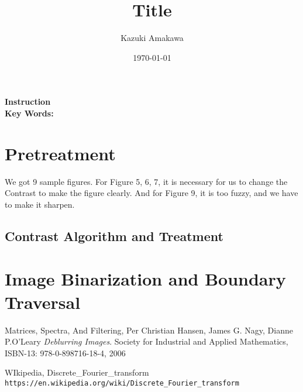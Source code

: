 \documentclass[12pt]{article}
\title{Title}
\author{Kazuki Amakawa}
\date{\today}
\begin{document}
\maketitle
\noindent \textbf{Instruction}\\

\noindent \textbf{Key Words:} \\
\newpage

\section{Pretreatment}
We got 9 sample figures. For Figure 5, 6, 7, it is necessary for us to change the Contrast to make the figure clearly. And for Figure 9, it is too fuzzy, and we have to make it sharpen.
\subsection{Contrast Algorithm and Treatment}

\section{Image Binarization and Boundary Traversal}


\newpage
\medskip
 
\begin{thebibliography}{9}
Matrices, Spectra, And Filtering, Per Christian Hansen, James G. Nagy, Dianne P.O'Leary
\textit{Deblurring Images}. 
Society for Industrial and Applied Mathematics, ISBN-13: 978-0-898716-18-4, 2006

WIkipedia, Discrete\_Fourier\_transform
\\\texttt{https://en.wikipedia.org/wiki/Discrete\_Fourier\_transform}
\end{thebibliography}
\end{document}
